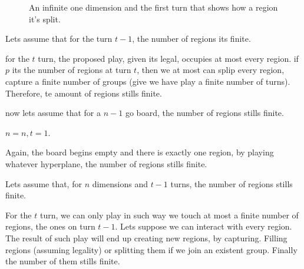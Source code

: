 \begin{figure}[H]
	\caption{An infinite one dimension and the first turn that shows how a region it's split.}
	\label{inf_ind_n=1_t=1}
\end{figure}

Lets assume that for the turn $t-1$, the number of regions its finite.

for the $t$ turn, the proposed play, given its legal, occupies at most every region. if $p$ its the number of regions at turn $t$, then we at most can splip every region, capture a finite number of groups (give we have play a finite number of turns). Therefore, te amount of regions stills finite.


now lets assume that for a $n-1$ go board, the number of regions stills finite.

$n=n, t=1$.

Again, the board begins empty and there is exactly one region, by playing whatever hyperplane, the number of regions stills finite.

Lets assume that, for $n$ dimensions and $t-1$ turns, the number of regions stills finite.

For the $t$ turn, we can only play in such way we touch at most a finite number of regions, the ones on turn $t-1$. Lets suppose we can interact with every region. The result of such play will end up creating new regions, by capturing. Filling regions (assuming legality) or splitting them if we join an existent group. Finally the number of them stills finite.

